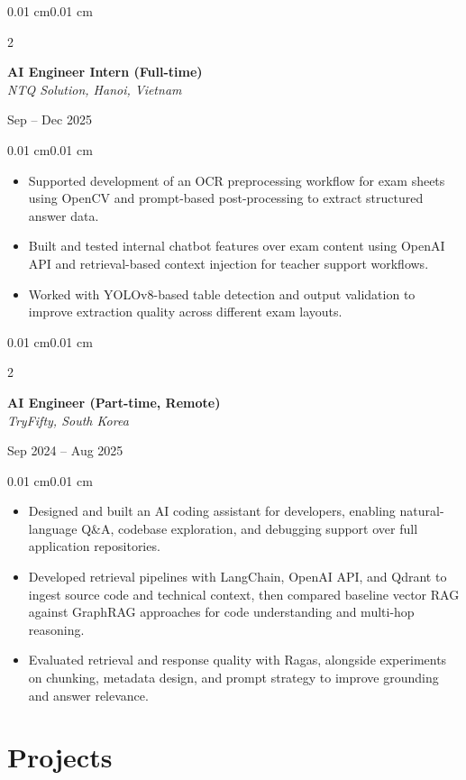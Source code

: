 \documentclass[10pt, letterpaper]{article}
\newenvironment{highlights}{
    \begin{itemize}[
        topsep=0.05 cm,
        parsep=0.05 cm,
        partopsep=0pt,
        itemsep=0pt,
        leftmargin=0.35 cm
    ]
}{
    \end{itemize}
}
\newenvironment{onecolentry}{
    \begin{adjustwidth}{0.01 cm}{0.01 cm}
}{
    \end{adjustwidth}
}
\newenvironment{twocolentry}[2][]{
    \onecolentry
    \def\secondColumn{#2}
    \setcolumnwidth{\fill, 4.3 cm}
    \begin{paracol}{2}
}{
    \switchcolumn \raggedleft \secondColumn
    \end{paracol}
    \endonecolentry
}
\begin{document}
\begin{twocolentry}{Sep -- Dec 2025}
    \textbf{AI Engineer Intern (Full-time)} \\
    \textit{NTQ Solution, Hanoi, Vietnam}
\end{twocolentry}

\begin{onecolentry}
\begin{highlights}
    \item Supported development of an OCR preprocessing workflow for exam sheets using OpenCV and prompt-based post-processing to extract structured answer data.
    \item Built and tested internal chatbot features over exam content using OpenAI API and retrieval-based context injection for teacher support workflows.
    \item Worked with YOLOv8-based table detection and output validation to improve extraction quality across different exam layouts.
\end{highlights}
\end{onecolentry}

\begin{twocolentry}{Sep 2024 -- Aug 2025}
    \textbf{AI Engineer (Part-time, Remote)} \\
    \textit{TryFifty, South Korea}
\end{twocolentry}

\begin{onecolentry}
\begin{highlights}
    \item Designed and built an AI coding assistant for developers, enabling natural-language Q\&A, codebase exploration, and debugging support over full application repositories.
    \item Developed retrieval pipelines with LangChain, OpenAI API, and Qdrant to ingest source code and technical context, then compared baseline vector RAG against GraphRAG approaches for code understanding and multi-hop reasoning.
    \item Evaluated retrieval and response quality with Ragas, alongside experiments on chunking, metadata design, and prompt strategy to improve grounding and answer relevance.
\end{highlights}
\end{onecolentry}

\section{Projects}
\end{document}
